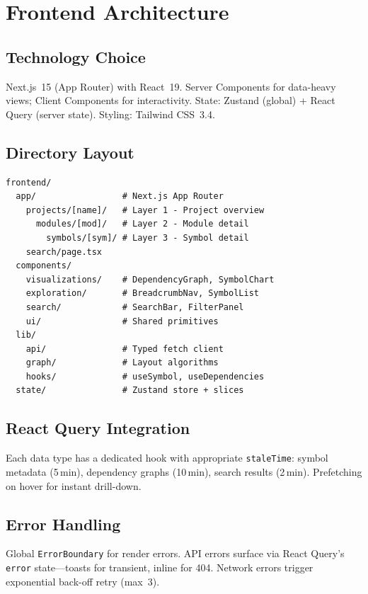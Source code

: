 \chapter{Frontend Architecture}

\section{Technology Choice}
Next.js~15 (App Router) with React~19.  Server Components for data-heavy
views; Client Components for interactivity.  State: Zustand (global) +
React Query (server state).  Styling: Tailwind CSS~3.4.

\section{Directory Layout}
\begin{lstlisting}[language={}]
frontend/
  app/                 # Next.js App Router
    projects/[name]/   # Layer 1 - Project overview
      modules/[mod]/   # Layer 2 - Module detail
        symbols/[sym]/ # Layer 3 - Symbol detail
    search/page.tsx
  components/
    visualizations/    # DependencyGraph, SymbolChart
    exploration/       # BreadcrumbNav, SymbolList
    search/            # SearchBar, FilterPanel
    ui/                # Shared primitives
  lib/
    api/               # Typed fetch client
    graph/             # Layout algorithms
    hooks/             # useSymbol, useDependencies
  state/               # Zustand store + slices
\end{lstlisting}

\section{React Query Integration}
Each data type has a dedicated hook with appropriate \texttt{staleTime}:
symbol metadata (5\,min), dependency graphs (10\,min), search results (2\,min).
Prefetching on hover for instant drill-down.

\section{Error Handling}
Global \texttt{ErrorBoundary} for render errors.  API errors surface via
React Query's \texttt{error} state---toasts for transient, inline for 404.
Network errors trigger exponential back-off retry (max~3).
